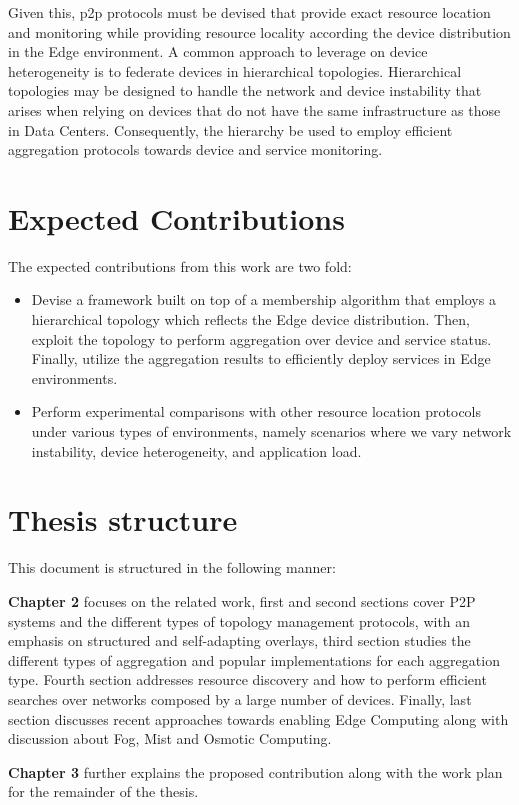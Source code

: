 Given this, p2p protocols must be devised that provide exact resource location and monitoring while providing resource locality according the device distribution in the Edge environment. A common approach to leverage on device heterogeneity is to federate devices in hierarchical topologies. Hierarchical topologies may be designed to handle the network and device instability that arises when relying on devices that do not have the same infrastructure as those in Data Centers. Consequently, the hierarchy be used to employ efficient aggregation protocols towards device and service monitoring.

\section{Expected Contributions}

The expected contributions from this work are two fold:

\begin{itemize}
    \item Devise a framework built on top of a membership algorithm that employs a hierarchical topology which reflects the Edge device distribution. Then, exploit the topology to perform aggregation over device and service status. Finally, utilize the aggregation results to efficiently deploy services in Edge environments.

    \item Perform experimental comparisons with other resource location protocols under various types of environments, namely scenarios where we vary network instability, device heterogeneity, and application load. 
\end{itemize}

\section{Thesis structure}

This document is structured in the following manner:

\textbf{Chapter 2} focuses on the related work, first and second sections cover P2P systems and the different types of topology management protocols, with an emphasis on structured and self-adapting overlays, third section studies the different types of aggregation and popular implementations for each aggregation type. Fourth section addresses resource discovery and how to perform efficient searches over networks composed by a large number of devices. Finally, last section discusses recent approaches towards enabling Edge Computing along with discussion about Fog, Mist and Osmotic Computing.

\textbf{Chapter 3} further explains the proposed contribution along with the work plan for the remainder of the thesis. 

